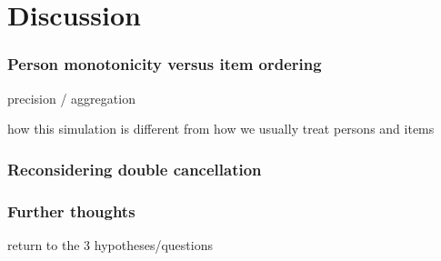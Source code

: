 \documentclass[10pt,serif,professionalfont]{beamer}
\begin{document}
\section{Discussion}

\begin{frame}
    \frametitle{Person monotonicity versus item ordering}

    precision / aggregation

    how this simulation is different from how we usually treat persons and items

\end{frame}

\begin{frame}
    \frametitle{Reconsidering double cancellation}

\end{frame}

\begin{frame}
    \frametitle{Further thoughts}
    
    return to the 3 hypotheses/questions

\end{frame}

\end{document}
